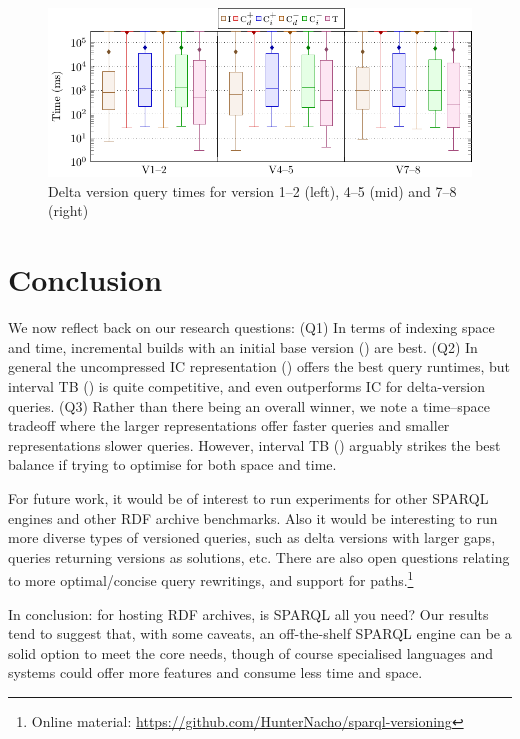 \documentclass{llncs}
\begin{document}
\begin{figure}[t]
\includegraphics[scale=0.8]{plots/boxplt-dvq}
\caption{Delta version query times for version 1--2 (left), 4--5 (mid) and 7--8 (right) \label{fig:dvq}}
\end{figure}

\section{Conclusion}

We now reflect back on our research questions: (Q1) In terms of indexing space and time, incremental builds with an initial base version (\cbpd) are best. (Q2) In general the uncompressed IC representation (\ic) offers the best query runtimes, but interval TB (\tb) is quite competitive, and even outperforms IC for delta-version queries. (Q3) Rather than there being an overall winner, we note a time--space tradeoff where the larger representations offer faster queries and smaller representations slower queries. However, interval TB (\tb) arguably strikes the best balance if trying to optimise for both space and time.

For future work, it would be of interest to run experiments for other SPARQL engines and other RDF archive benchmarks. Also it would be interesting to run more diverse types of versioned queries, such as delta versions with larger gaps, queries returning versions as solutions, etc. There are also open questions relating to more optimal/concise query rewritings, and support for paths.\footnote{Online material: \url{https://github.com/HunterNacho/sparql-versioning}}

In conclusion: for hosting RDF archives, is SPARQL all you need? Our results tend to suggest that, with some caveats, an off-the-shelf SPARQL engine can be a solid option to meet the core needs, though of course specialised languages and systems could offer more features and consume less time and space.



\end{document}
